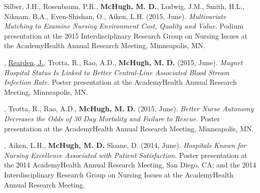 \documentclass[10pt,]{article}
\begin{document}
{{{{{{{{{{{{{{\begin{hangparas}{.25in}{1}
\end{hangparas}

\vspace{4mm}

\begin{hangparas}{.25in}{1}

\*Silber, J.H., Rosenbaum, P.R., {\textbf {McHugh, M. D.}}, Ludwig, J.M., Smith, H.L., Niknam, B.A., Even-Shishan, O., Aiken, L.H. (2015, June). {\textit {Multivariate Matching to Examine Nursing Environment Cost, Quality and Value.}} Podium presentation at the 2015 Interdisciplinary Research Group on Nursing Issues at the AcademyHealth Annual Research Meeting, Minneapolis, MN.

\end{hangparas}

\vspace{4mm}

\begin{hangparas}{.25in}{1}

, {\underline {Rearden, J.}}, Trotta, R., Rao, A.D., {\textbf {McHugh, M. D.}} (2015, June). {\textit {Magnet Hospital Status Is Linked to Better Central-Line Associated Blood Stream Infection Rate.}} Poster presentation at the AcademyHealth Annual Research Meeting, Minneapolis, MN.

\end{hangparas}

\vspace{4mm}

\begin{hangparas}{.25in}{1}

, Trotta, R., Rao, A.D., {\textbf {McHugh, M. D.}} (2015, June). {\textit {Better Nurse Autonomy Decreases the Odds of 30 Day Mortality and Failure to Rescue.}} Poster presentation at the AcademyHealth Annual Research Meeting, Minneapolis, MN.

\end{hangparas}

\vspace{4mm}

\begin{hangparas}{.25in}{1}

, Aiken, L.H., {\textbf {McHugh, M. D.}} Sloane, D. (2014, June). {\textit {Hospitals Known for Nursing Excellence Associated with Patient Satisfaction.}} Poster presentation at the 2014 AcademyHealth Annual Research Meeting, San Diego, CA; and the 2014 Interdisciplinary Research Group on Nursing Issues at the AcademyHealth Annual Research Meeting.


\end{hangparas}}}}}}}}}}}}}}}
\end{document}
